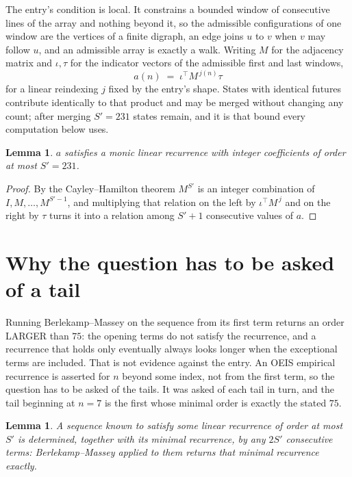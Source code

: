 \documentclass[11pt,a4paper]{article}
\theoremstyle{plain}
\newtheorem{lemma}[theorem]{Lemma}
\theoremstyle{definition}
\begin{document}
The entry's condition is local. It constrains a bounded window of consecutive lines of the
array and nothing beyond it, so the admissible configurations of one window are the vertices of
a finite digraph, an edge joins $u$ to $v$ when $v$ may follow $u$, and an admissible array is
exactly a walk. Writing $M$ for the adjacency matrix and $\iota,\tau$ for the indicator vectors
of the admissible first and last windows,
\[
a(n)\;=\;\iota^{\!\top}M^{\,j(n)}\tau
\]
for a linear reindexing $j$ fixed by the entry's shape. States with identical futures
contribute identically to that product and may be merged without changing any count; after
merging $S'=231$ states remain, and it is that bound every computation below uses.

\begin{lemma}\label{lem:cf}
$a$ satisfies a monic linear recurrence with integer coefficients of order at most $S'=231$.
\end{lemma}

\begin{proof}
By the Cayley--Hamilton theorem $M^{S'}$ is an integer combination of $I,M,\dots,M^{S'-1}$,
and multiplying that relation on the left by $\iota^{\!\top}M^{\,j}$ and on the right by
$\tau$ turns it into a relation among $S'+1$ consecutive values of $a$.
\end{proof}

\section{Why the question has to be asked of a tail}

Running Berlekamp--Massey on the sequence from its first term returns an order LARGER than $75$: the opening terms do not satisfy the recurrence, and a recurrence that holds only eventually always looks longer when the exceptional terms are included. That is not evidence against the entry. An OEIS empirical recurrence is asserted for $n$ beyond some index, not from the first term, so the question has to be asked of the tails. It was asked of each tail in turn, and the tail beginning at $n=7$ is the first whose minimal order is exactly the stated $75$.

\begin{lemma}\label{lem:bm}
A sequence known to satisfy some linear recurrence of order at most $S'$ is determined,
together with its minimal recurrence, by any $2S'$ consecutive terms: Berlekamp--Massey applied
to them returns that minimal recurrence exactly.
\end{lemma}
\end{document}

